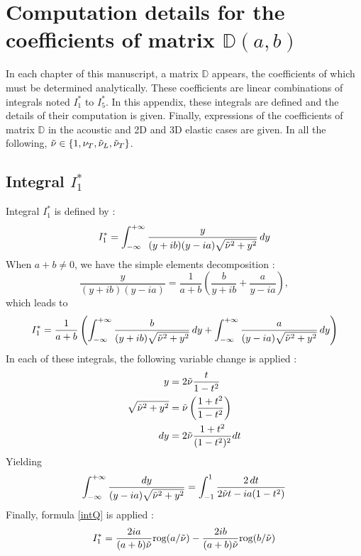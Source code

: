 \chapter{Computation details for the coefficients of matrix $\mathbb{D}(a,b)$}
\label{matD}
In each chapter of this manuscript, a matrix $\mathbb{D}$ appears, the coefficients of which must be determined analytically. These coefficients are linear combinations of integrals noted $I_1^*$ to $I_5^*$. In this appendix, these integrals are defined and the details of their computation is given. Finally, expressions of the coefficients of matrix $\mathbb{D}$ in the acoustic and 2D and 3D elastic cases are given. In all the following, $\tilde{\nu} \in \{ 1,\nu_T,\tilde{\nu}_L,\tilde{\nu}_T \}$.

\section{Integral $I_1^*$}
\label{calcI1}
Integral $I_1^*$ is defined by :
\begin{equation}
\label{defI1}
I_1^*=\int_{-\infty}^{+\infty} \frac{y}{(y+ib)(y-ia)\sqrt{\tilde{\nu}^2+y^2}}\,dy
\end{equation}
When $a+b \neq 0$, we have the simple elements decomposition :
\begin{equation}
\frac{y}{(y+ib)(y-ia)}=\frac{1}{a+b} \left( \frac{b}{y+ib}+\frac{a}{y-ia} \right), 
\label{decomp2}
\end{equation}
which leads to
\begin{equation}
I_1^*= \frac{1}{a+b} \left( \int_{-\infty}^{+\infty} \frac{b}{(y+ib)\sqrt{\tilde{\nu}^2+y^2}} \,dy +\int_{-\infty}^{+\infty} \frac{a}{(y-ia)\sqrt{\tilde{\nu}^2+y^2}} \,dy \right)
\end{equation}
In each of these integrals, the following variable change is applied :
\begin{equation}
\begin{split}
 y&=2\tilde{\nu} \frac{t}{1-t^2} \\
\sqrt{\tilde{\nu}^2+y^2}&=\tilde{\nu}\left( \frac{1+t^2}{1-t^2} \right)  \\
 dy&= 2\tilde{\nu} \frac{1+t^2}{(1-t^2)^2}dt 
\end{split}
\label{changevar}
\end{equation}
Yielding
\begin{equation}
\int_{-\infty}^{+\infty} \frac{dy}{(y-ia)\sqrt{\tilde{\nu}^2+y^2}}=\int_{-1}^1\frac{2\,dt}{2\tilde{\nu} t-ia(1-t^2)}
\end{equation}
Finally, formula \eqref{intQ} is applied :
\begin{equation}
I_1^*=\frac{2ia}{(a+b)\tilde{\nu}}\mbox{rog}(a/\tilde{\nu})-\frac{2ib}{(a+b)\tilde{\nu}}\mbox{rog}(b/\tilde{\nu})
\label{valI1}
\end{equation}


